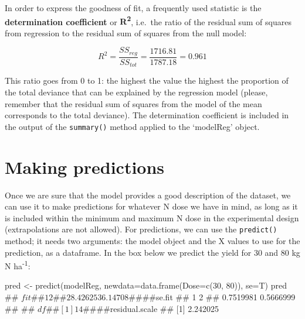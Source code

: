 \documentclass[a4paper,12pt,oneside]{book}
\newenvironment{Shaded}{\begin{snugshade}}{\end{snugshade}}
\newcommand{\DecValTok}[1]{#1}
\newcommand{\DocumentationTok}[1]{#1}
\newcommand{\OtherTok}[1]{#1}
\newcommand{\FunctionTok}[1]{#1}
\newcommand{\AttributeTok}[1]{#1}
\newcommand{\NormalTok}[1]{#1}
\begin{document}
In order to express the goodness of fit, a frequently used statistic is the \textbf{determination coefficient} or \textbf{R\textsuperscript{2}}, i.e.~the ratio of the residual sum of squares from regression to the residual sum of squares from the null model:

\[R^2 = \frac{SS_{reg}}{SS_{tot}} = \frac{1716.81}{1787.18} = 0.961\]

This ratio goes from 0 to 1: the highest the value the highest the proportion of the total deviance that can be explained by the regression model (please, remember that the residual sum of squares from the model of the mean corresponds to the total deviance). The determination coefficient is included in the output of the \texttt{summary()} method applied to the `modelReg' object.

\hypertarget{making-predictions}{%
\section{Making predictions}\label{making-predictions}}

Once we are sure that the model provides a good description of the dataset, we can use it to make predictions for whatever N dose we have in mind, as long as it is included within the minimum and maximum N dose in the experimental design (extrapolations are not allowed). For predictions, we can use the \texttt{predict()} method; it needs two arguments: the model object and the X values to use for the prediction, as a dataframe. In the box below we predict the yield for 30 and 80 kg N ha\textsuperscript{-1}:

\begin{Shaded}
\begin{Highlighting}[]
\NormalTok{pred }\OtherTok{\textless{}{-}} \FunctionTok{predict}\NormalTok{(modelReg, }\AttributeTok{newdata=}\FunctionTok{data.frame}\NormalTok{(}\AttributeTok{Dose=}\FunctionTok{c}\NormalTok{(}\DecValTok{30}\NormalTok{, }\DecValTok{80}\NormalTok{)), }\AttributeTok{se=}\NormalTok{T)}
\NormalTok{pred}
\DocumentationTok{\#\# $fit}
\DocumentationTok{\#\#        1        2 }
\DocumentationTok{\#\# 28.42625 36.14708 }
\DocumentationTok{\#\# }
\DocumentationTok{\#\# $se.fit}
\DocumentationTok{\#\#         1         2 }
\DocumentationTok{\#\# 0.7519981 0.5666999 }
\DocumentationTok{\#\# }
\DocumentationTok{\#\# $df}
\DocumentationTok{\#\# [1] 14}
\DocumentationTok{\#\# }
\DocumentationTok{\#\# $residual.scale}
\DocumentationTok{\#\# [1] 2.242025}
\end{Highlighting}
\end{Shaded}
\end{document}

